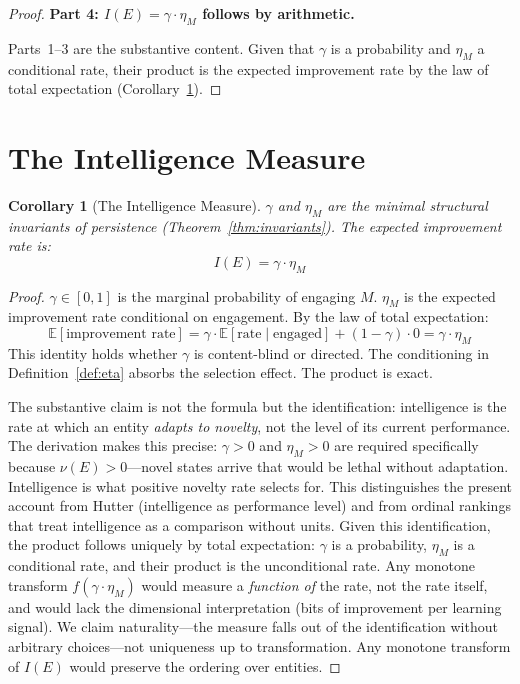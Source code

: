 \documentclass[11pt]{article}
\newtheorem{corollary}[theorem]{Corollary}
\theoremstyle{definition}
\theoremstyle{remark}
\begin{document}
\begin{proof}
\medskip
\textbf{Part 4: $I(E) = \gamma \cdot \eta_M$ follows by arithmetic.}

Parts~1--3 are the substantive content. Given that $\gamma$ is a
probability and $\eta_M$ a conditional rate, their product is the
expected improvement rate by the law of total expectation
(Corollary~\ref{cor:measure}).
\end{proof}

\section{The Intelligence Measure}
\label{sec:measure}

\begin{corollary}[The Intelligence Measure]
\label{cor:measure}
$\gamma$ and $\eta_M$ are the minimal structural invariants of persistence
(Theorem~\ref{thm:invariants}). The expected improvement rate is:
\[
I(E) = \gamma \cdot \eta_M
\]
\end{corollary}

\begin{proof}
$\gamma \in [0, 1]$ is the marginal probability of engaging $M$.
$\eta_M$ is the expected improvement rate conditional on engagement.
By the law of total expectation:
\[
\mathbb{E}[\text{improvement rate}]
= \gamma \cdot \mathbb{E}[\text{rate} \mid \text{engaged}]
+ (1 - \gamma) \cdot 0
= \gamma \cdot \eta_M
\]
This identity holds whether $\gamma$ is content-blind or directed.
The conditioning in Definition~\ref{def:eta} absorbs the selection
effect. The product is exact.

The substantive claim is not the formula but the identification:
intelligence is the rate at which an entity \emph{adapts to novelty},
not the level of its current performance. The derivation makes this
precise: $\gamma > 0$ and $\eta_M > 0$ are required specifically
because $\nu(E) > 0$---novel states arrive that would be lethal
without adaptation. Intelligence is what positive novelty rate
selects for.
This distinguishes the present account from Hutter
\cite{Hutter2005} (intelligence as performance level) and from
ordinal rankings that treat intelligence as a comparison without
units. Given this identification, the product follows uniquely by
total expectation: $\gamma$ is a probability, $\eta_M$ is a
conditional rate, and their product is the unconditional rate.
Any monotone transform $f(\gamma \cdot \eta_M)$ would measure a
\emph{function of} the rate, not the rate itself, and would lack
the dimensional interpretation (bits of improvement per learning
signal). We claim naturality---the measure falls out of the identification
without arbitrary choices---not uniqueness up to transformation.
Any monotone transform of $I(E)$ would preserve the ordering over
entities.
\end{proof}
\end{document}
